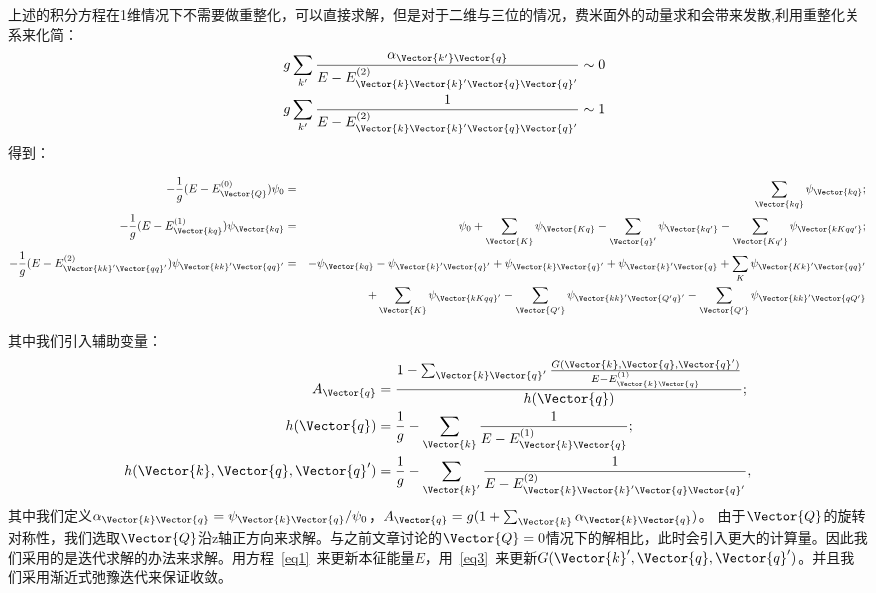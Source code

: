 上述的积分方程在1维情况下不需要做重整化，可以直接求解，但是对于二维与三位的情况，费米面外的动量求和会带来发散,利用重整化关系来化简：
\begin{equation}
\begin{split}
\quad g\sum_{k'} \frac{\alpha_{{\Vector{k'} }{\Vector{q} }}}{E-E^{(2)}_{\Vector{k}\Vector{k}'\Vector{q}\Vector{q}'}}\sim 0\\
\quad g\sum_{k'} \frac{1}{E-E^{(2)}_{\Vector{k}\Vector{k}'\Vector{q}\Vector{q}'}}\sim 1\\
\end{split}
\end{equation}
得到：

\begin{eqnarray}
\label{eq0}
-\frac{1}{g}(E-E^{(0)}_{\Vector{Q}})\psi _0&=&\sum_{\Vector{kq}}\psi _{\Vector{kq}};\\
-\frac{1}{g}(E-E^{(1)}_{\Vector{kq}})\psi _{\Vector{kq}}&=&\psi _0+ \sum_{\Vector{K}} \psi _{\Vector{Kq}}-
\sum_{\Vector{q}'} \psi _{\Vector{kq'}}-\sum_{\Vector{Kq'}}\psi _{\Vector{kKqq'}};\\
-\frac{1}{g}(E-E^{(2)}_{\Vector{kk}'\Vector{qq}'})\psi _{\Vector{kk}'\Vector{qq}'}&=&-\psi _{\Vector{kq}}-\psi _{\Vector{k}'\Vector{q}'}+\psi _{\Vector{k}\Vector{q}'}+\psi _{\Vector{k}'\Vector{q}}+ \sum_{K} \psi _{\Vector{Kk}'\Vector{qq}'}\\
\quad \quad &&+\sum_{\Vector{K}} \psi _{\Vector{kKqq}'} -\sum_{\Vector{Q'}} \psi _{\Vector{kk}'\Vector{Q'q}'}-\sum_{\Vector{Q'}} \psi _{\Vector{kk}'\Vector{qQ'}} \nonumber\\
\end{eqnarray}


其中我们引入辅助变量：
\begin{equation}
\begin{split}
{A}_{\Vector{q}} &= \frac{ 1- \sum_{\Vector{k} \Vector{q}'} \frac{{G}(\Vector{k},\Vector{q},\Vector{q}')}{E-E^{(1)}_{\Vector{k} \Vector{q}}}  }{h(\Vector{q})};\\
h(\Vector{q}) &= \frac{1}{g} - \sum_{\Vector{k}} \frac{1}{E-E^{(1)}_{\Vector{k} \Vector{q}}} %
;  \\
h(\Vector{k},\Vector{q},\Vector{q}') &= \frac{1}{g} - \sum_{\Vector{k}'} \frac{1}{E-E^{(2)}_{\Vector{k}\Vector{k}'\Vector{q}\Vector{q}'}}, %
\end{split}
\end{equation}
其中我们定义${\alpha}_{\Vector{k}\Vector{q}} = \psi_{\Vector{k}\Vector{q}}/ \psi_0$，${A}_{\Vector{q}} = g (1+\sum_{\Vector{k} }{\alpha}_{\Vector{k}\Vector{q}})$。
由于$\Vector{Q}$的旋转对称性，我们选取$\Vector{Q}$沿z轴正方向来求解。与之前文章讨论的$\Vector{Q}=0$情况下的解相比，此时会引入更大的计算量。因此我们采用的是迭代求解的办法来求解。用方程~\ref{eq1}~来更新本征能量$E$，用~\ref{eq3}~来更新${G}(\Vector{k}',\Vector{q},\Vector{q}')$。并且我们采用渐近式弛豫迭代来保证收敛。

